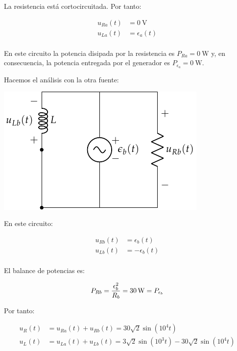 La resistencia está cortocircuitada. Por tanto:

\begin{align*}
  u_{Ra}(t) &= \qty{0}{\volt}\\
  u_{La}(t) &= \epsilon_a(t)\\  
\end{align*}

En este circuito la potencia disipada por la resistencia es $P_{Ra} = \qty{0}{\watt}$ y, en consecuencia, la potencia entregada por el generador es $P_{\epsilon_a} = \qty{0}{\watt}$.

Hacemos el análisis con la otra fuente:

\begin{center}
\includegraphics{figuras/superposicion2_B}
\end{center}

En este circuito:

\begin{align*}
  u_{Rb}(t) &= \epsilon_b(t)\\
  u_{Lb}(t) &= -\epsilon_b(t)\\  
\end{align*}

El balance de potencias es:

\begin{equation*}
  P_{Rb} = \frac{\epsilon_b^2}{R_b} = \qty{30}{\watt} = P_{\epsilon_b}\\
\end{equation*}

Por tanto:

\begin{align*}
  u_R(t) &= u_{Ra}(t) + u_{Rb}(t) = 30\sqrt{2}\sin(10^4 t)\\
  u_L(t) &= u_{La}(t) + u_{Lb}(t) = 3\sqrt{2}\sin(10^3 t) - 30\sqrt{2}\sin(10^4 t)\\
\end{align*}

